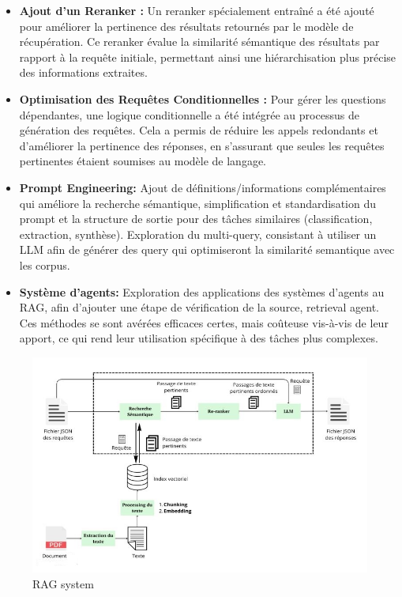 \documentclass[13pt,a4paper]{article}
\begin{document}
\begin{itemize}
\item \textbf{Ajout d'un Reranker :} Un reranker spécialement entraîné a été ajouté pour améliorer la pertinence des résultats retournés par le modèle de récupération. Ce reranker évalue la similarité sémantique des résultats par rapport à la requête initiale, permettant ainsi une hiérarchisation plus précise des informations extraites.
\item \textbf{Optimisation des Requêtes Conditionnelles :} Pour gérer les questions dépendantes, une logique conditionnelle a été intégrée au processus de génération des requêtes. Cela a permis de réduire les appels redondants et d'améliorer la pertinence des réponses, en s'assurant que seules les requêtes pertinentes étaient soumises au modèle de langage.
\item \textbf{Prompt Engineering:} Ajout de définitions/informations complémentaires qui améliore la recherche sémantique, simplification et standardisation du prompt et la structure de sortie pour des tâches similaires (classification, extraction, synthèse). Exploration du multi-query, consistant à utiliser un LLM afin de générer des query qui optimiseront la similarité semantique avec les corpus.
\item \textbf{Système d'agents:} Exploration des applications des systèmes d'agents au RAG, afin d'ajouter une étape de vérification de la source, retrieval agent. Ces méthodes se sont avérées efficaces certes, mais coûteuse vis-à-vis de leur apport, ce qui rend leur utilisation spécifique à des tâches plus complexes.

\end{itemize}

\begin{figure}[h]
    \centering
    \includegraphics[scale=0.8]{rag.jpg}
    \caption{RAG system}
    \label{fig:mesh1}
\end{figure}
\newpage
\end{document}
